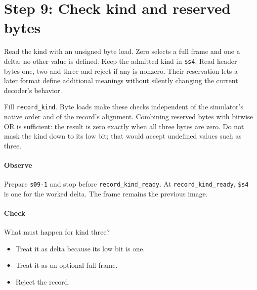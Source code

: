\section{Step 9: Check kind and reserved bytes}
Read the kind with an unsigned byte load. Zero selects a full frame and one a
delta; no other value is defined. Keep the admitted kind in \texttt{\$s4}. Read
header bytes one, two and three and reject if any is nonzero. Their reservation
lets a later format define additional meanings without silently changing the
current decoder's behavior.

Fill \texttt{record\_kind}. Byte loads make these checks independent of the
simulator's native order and of the record's alignment. Combining reserved bytes
with bitwise OR is sufficient: the result is zero exactly when all three bytes
are zero. Do not mask the kind down to its low bit; that would accept undefined
values such as three.

\paragraph{Observe} Prepare \texttt{s09-1} and stop before
\texttt{record\_kind\_ready}. At \texttt{record\_kind\_ready}, \texttt{\$s4} is one for
the worked delta. The frame remains the previous image.

\paragraph{Check} What must happen for kind three?
\begin{itemize}
  \item[A.] Treat it as delta because its low bit is one.
  \item[B.] Treat it as an optional full frame.
  \item[C.] Reject the record.
\end{itemize}
